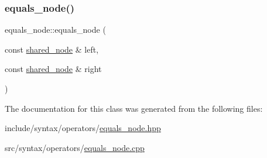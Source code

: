 \subsubsection{\texorpdfstring{equals\+\_\+node()}{equals\_node()}}
{\footnotesize\ttfamily equals\+\_\+node\+::equals\+\_\+node (\begin{DoxyParamCaption}\item[{const \hyperlink{namespacejawe_a3f307481d921b6cbb50cc8511fc2b544}{shared\+\_\+node} \&}]{left,  }\item[{const \hyperlink{namespacejawe_a3f307481d921b6cbb50cc8511fc2b544}{shared\+\_\+node} \&}]{right }\end{DoxyParamCaption})}



The documentation for this class was generated from the following files\+:\begin{DoxyCompactItemize}
\item 
include/syntax/operators/\hyperlink{equals__node_8hpp}{equals\+\_\+node.\+hpp}\item 
src/syntax/operators/\hyperlink{equals__node_8cpp}{equals\+\_\+node.\+cpp}\end{DoxyCompactItemize}
